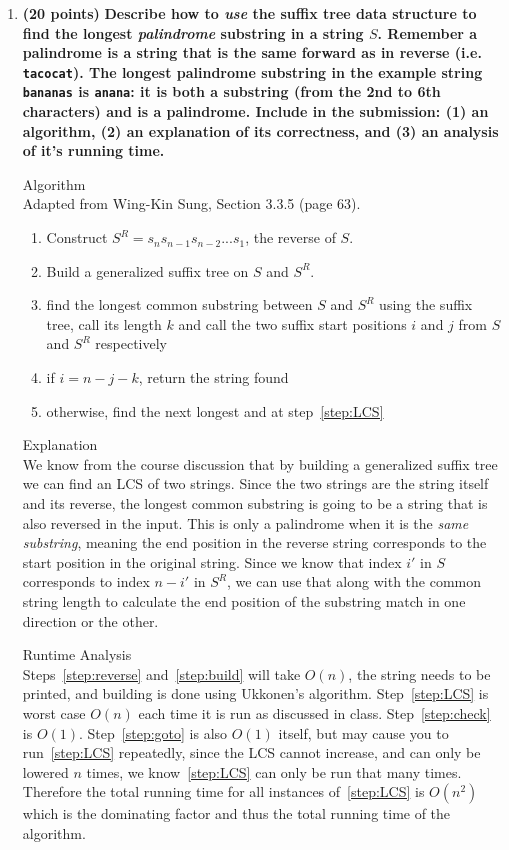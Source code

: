 \documentclass[11pt, oneside]{article}   	%
\begin{document}
\begin{enumerate}
\item \textbf{(20 points)} 
\textbf{Describe how to \emph{use} the suffix tree data structure to find the longest \textit{palindrome} substring in a string $S$. 
Remember a palindrome is a string that is the same forward as in reverse (i.e. \texttt{tacocat}). 
The longest palindrome substring in the example string \texttt{bananas} is \texttt{anana}:
it is both a substring (from the 2nd to 6th characters) and is a palindrome. 
Include in the submission: (1) an algorithm, (2) an explanation of its correctness, and (3) an analysis of it's running time.}


{\huge Algorithm}\\
Adapted from Wing-Kin Sung, Section 3.3.5 (page 63). 

\begin{enumerate}
\item  \label{step:reverse} Construct $S^R = s_ns_{n-1}s_{n-2}...s_1$, the reverse of $S$. 
\item  \label{step:build} Build a generalized suffix tree on $S$ and $S^R$.
\item \label{step:LCS} find the longest common substring between $S$ and $S^R$ using the suffix tree, call its length $k$ and call the two suffix start positions $i$ and $j$ from $S$ and $S^R$ respectively
\item  \label{step:check} if $i = n - j - k$, return the string found
\item  \label{step:goto} otherwise, find the next longest and at step~\ref{step:LCS}
\end{enumerate}

{\huge Explanation}\\
We know from the course discussion that by building a generalized suffix tree we can find an LCS of two strings. 
Since the two strings are the string itself and its reverse, the longest common substring is going to be a string that is also reversed in the input. 
This is only a palindrome when it is the \emph{same substring}, meaning the end position in the reverse string corresponds to the start position in the original string. 
Since we know that index $i'$ in $S$ corresponds to index $n-i'$ in $S^R$, 
we can use that along with the common string length to calculate the end position of the substring match in one direction or the other. 

{\huge Runtime Analysis}\\
Steps~\ref{step:reverse} and~\ref{step:build} will take $O(n)$, the string needs to be printed, and building is done using Ukkonen's algorithm. 
Step~\ref{step:LCS} is worst case $O(n)$ each time it is run as discussed in class. 
Step~\ref{step:check} is $O(1)$. 
Step~\ref{step:goto} is also $O(1)$ itself, but may cause you to run~\ref{step:LCS} repeatedly, 
since the LCS cannot increase, and can only be lowered $n$ times, we know~\ref{step:LCS} can only be run that many times.
Therefore the total running time for all instances of~\ref{step:LCS} is $O(n^2)$ which is the dominating factor and thus the total running time of the algorithm. 

\end{enumerate}
\end{document}
